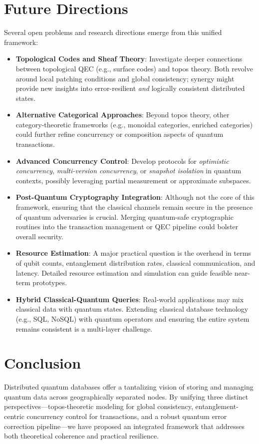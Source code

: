 \documentclass[11pt]{article}
\begin{document}
\section{Future Directions}
\label{sec:future_work}
Several open problems and research directions emerge from this unified framework:

\begin{itemize}
    \item \textbf{Topological Codes and Sheaf Theory}: Investigate deeper connections between topological QEC (e.g., surface codes) and topos theory. Both revolve around local patching conditions and global consistency; synergy might provide new insights into error-resilient \emph{and} logically consistent distributed states.
    \item \textbf{Alternative Categorical Approaches}: Beyond topos theory, other category-theoretic frameworks (e.g., monoidal categories, enriched categories) could further refine concurrency or composition aspects of quantum transactions.
    \item \textbf{Advanced Concurrency Control}: Develop protocols for \emph{optimistic concurrency}, \emph{multi-version concurrency}, or \emph{snapshot isolation} in quantum contexts, possibly leveraging partial measurement or approximate subspaces.
    \item \textbf{Post-Quantum Cryptography Integration}: Although not the core of this framework, ensuring that the classical channels remain secure in the presence of quantum adversaries is crucial. Merging quantum-safe cryptographic routines into the transaction management or QEC pipeline could bolster overall security.
    \item \textbf{Resource Estimation}: A major practical question is the overhead in terms of qubit counts, entanglement distribution rates, classical communication, and latency. Detailed resource estimation and simulation can guide feasible near-term prototypes.
    \item \textbf{Hybrid Classical-Quantum Queries}: Real-world applications may mix classical data with quantum states. Extending classical database technology (e.g., SQL, NoSQL) with quantum operators and ensuring the entire system remains consistent is a multi-layer challenge.
\end{itemize}

\section{Conclusion}
\label{sec:conclusion}
Distributed quantum databases offer a tantalizing vision of storing and managing quantum data across geographically separated nodes. By unifying three distinct perspectives---topos-theoretic modeling for global consistency, entanglement-centric concurrency control for transactions, and a robust quantum error correction pipeline---we have proposed an integrated framework that addresses both theoretical coherence and practical resilience.
\end{document}
